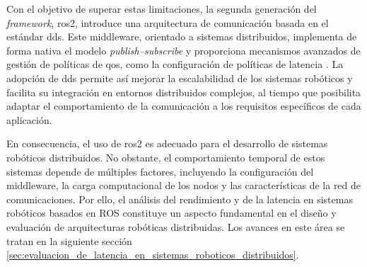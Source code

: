 Con el objetivo de superar estas limitaciones, la segunda generación del \textit{framework}, \gls{ros2}, introduce una arquitectura de comunicación basada en el estándar \gls{dds}. Este middleware, orientado a sistemas distribuidos, implementa de forma nativa el modelo \textit{publish--subscribe} y proporciona mecanismos avanzados de gestión de políticas de \gls{qos}, como la configuración de políticas de latencia \cite{ros_concepts}. La adopción de \gls{dds} permite así mejorar la escalabilidad de los sistemas robóticos y facilita su integración en entornos distribuidos complejos, al tiempo que posibilita adaptar el comportamiento de la comunicación a los requisitos específicos de cada aplicación.

En consecuencia, el uso de \gls{ros2} es adecuado para el desarrollo de sistemas robóticos distribuidos. No obstante, el comportamiento temporal de estos sistemas depende de múltiples factores, incluyendo la configuración del middleware, la carga computacional de los nodos y las características de la red de comunicaciones. Por ello, el análisis del rendimiento y de la latencia en sistemas robóticos basados en ROS constituye un aspecto fundamental en el diseño y evaluación de arquitecturas robóticas distribuidas. Los avances en este área se tratan en la siguiente sección \ref{sec:evaluacion_de_latencia_en_sistemas_roboticos_distribuidos}.
